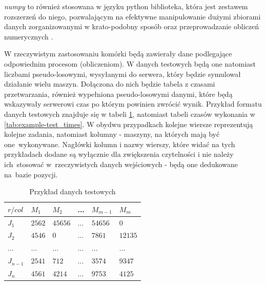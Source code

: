 \documentclass[brudnopis]{xmgr}
\begin{document}
\emph{numpy} to również stosowana w języku python biblioteka, która jest zestawem rozszerzeń do niego, pozwalającym na efektywne manipulowanie dużymi zbiorami danych zorganizowanymi w krato-podobny sposób oraz przeprowadzanie obliczeń numerycznych \cite{NUMPY1:2020:X} \cite{NUMPY2:1999:X}.
\medskip

W rzeczywistym zastosowaniu komórki będą zawierały dane podlegające odpowiednim procesom (obliczeniom).
W danych testowych będą one natomiast liczbami pseudo-losowymi, wysyłanymi do serwera, który będzie symulował działanie wielu maszyn. Dołączona do nich będzie tabela z czasami przetwarzania, również wypełniona pseudo-losowymi danymi, które będą wskazywały serwerowi czas po którym powinien zwrócić wynik.
Przykład formatu danych testowych znajduje się w tabeli \ref{tab:example-test_data}, natomiast tabeli czasów wykonania w \ref{tab:example-test_times}. W obydwu przypadkach kolejne wiersze reprezentują kolejne zadania, natomiast kolumny - maszyny, na których mają być one~wykonywane. Nagłówki kolumn i nazwy wierszy, które widać na tych przykładach dodane są wyłącznie dla zwiększenia czytelności i nie należy ich~stosować w~rzeczywistych danych wejściowych - będą one dedukowane na~bazie pozycji.
\medskip

\begin{table}[!tbh]
\begin{tabular}{|l|l|l|l|l|l|} \hline
$r / col$   & $M_1$     & $M_2$     & ...   & $M_{m-1}$ & $M_{m}$   \\ \hline
$J_1$       & $2562$    & $45656$   & ...   & $54656$   & $0$       \\ \hline
$J_2$       & $4546$    & $0$       & ...   & $7861$    & $12135$   \\ \hline
$...$       & $...$     & $...$     & $...$ & $...$     & $...$     \\ \hline
$J_{n-1}$   & $2541$    & $712$     & ...   & $3574$    & $9347$    \\ \hline
$J_{n}$     & $4561$    & $4214$    & ...   & $9753$    & $4125$    \\ \hline
\end{tabular}
\caption{Przykład danych testowych\label{tab:example-test_data}}
\end{table}
\end{document}
